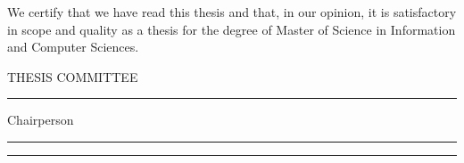 
\newpage

\par\vspace*{1.0in}


\noindent We certify that we have read this thesis and that, in our
opinion, it is satisfactory in scope and quality as a thesis for the
degree of Master of Science in Information and Computer Sciences.

\vspace*{0.8in}

\begin{flushright}

THESIS COMMITTEE\ \ \ \ \ \ 

\vspace{0.2in}

\rule{2.2in}{.01in}

\end{flushright}

\hspace{4.1in} Chairperson

\begin{flushright}
\rule{2.2in}{.01in}
\end{flushright}

\begin{flushright}
\vspace{0.15in}
\rule{2.2in}{.01in}
\end{flushright}
\vfill


%
